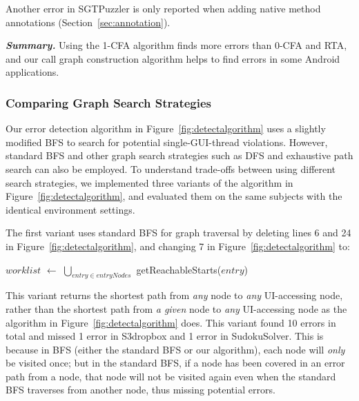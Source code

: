 Another error in SGTPuzzler is only reported when adding \annotationnum native method
annotations (Section~\ref{sec:annotation}). 



\vspace{1mm}

\noindent \textbf{\textit{Summary.}} Using the 1-CFA 
algorithm finds more errors than 0-CFA and RTA, and our call
graph construction algorithm helps to find errors in some
Android applications.


\subsubsection{Comparing Graph Search Strategies}
\label{sec:search}

Our error detection algorithm in Figure~\ref{fig:detectalgorithm} uses a
slightly modified BFS to search for
potential single-GUI-thread violations. However, standard BFS
and other graph search strategies such as
DFS and exhaustive path search can also be employed. To
understand trade-offs between using different search strategies, we 
implemented three variants of the algorithm in Figure~\ref{fig:detectalgorithm}, and
evaluated them on the same subjects with the identical environment settings.

The first variant uses standard BFS for graph traversal by deleting
lines 6 and 24 in Figure~\ref{fig:detectalgorithm}, and changing
7 in Figure~\ref{fig:detectalgorithm} to:

\vspace{0.2mm}
$\mathit{worklist}$ $\leftarrow$ $\bigcup_{entry \in entryNodes}$ getReachableStarts($\mathit{entry}$)
\vspace{0.2mm}

\noindent This variant returns the shortest path from \textit{any}  node
to \textit{any} UI-accessing node, rather than the shortest path from \textit{a given}
 node to \textit{any} UI-accessing node as the algorithm in
Figure~\ref{fig:detectalgorithm} does.
This variant found 10 errors in total and missed 1 error in S3dropbox and 1 error in
SudokuSolver. This is because in BFS (either the standard BFS or our algorithm), each
node will \textit{only} be visited once; but in the standard BFS, if a node has been covered
in an error path from a  node, that node will not be visited again
even when the standard BFS traverses from another  node, thus
missing potential errors.

